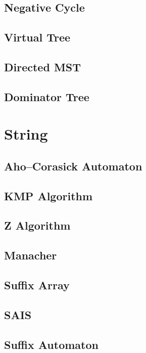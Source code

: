 \subsection{Negative Cycle}

\subsection{Virtual Tree}

\subsection{Directed MST}

\subsection{Dominator Tree}


\section{String}
\subsection{Aho–Corasick Automaton}

\subsection{KMP Algorithm}

\subsection{Z Algorithm}

\subsection{Manacher}

\subsection{Suffix Array}

\subsection{SAIS}

\subsection{Suffix Automaton}

